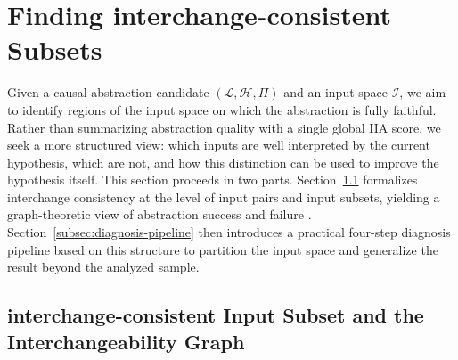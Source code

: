 \section{Finding interchange-consistent Subsets}
\label{sec:method}

Given a causal abstraction candidate \((\mathcal L,\mathcal H,\Pi)\) and an input space \(\mathcal I\), we aim to identify regions of the input space on which the abstraction is fully faithful. Rather than summarizing abstraction quality with a single global IIA score, we seek a more structured view: which inputs are well interpreted by the current hypothesis, which are not, and how this distinction can be used to improve the hypothesis itself. This section proceeds in two parts. Section~\ref{subsec:defining-perfect} formalizes interchange consistency at the level of input pairs and input subsets, yielding a graph-theoretic view of abstraction success and failure \citep{geiger-etal-2020-neural,pislar2025combining}. Section~\ref{subsec:diagnosis-pipeline} then introduces a practical four-step diagnosis pipeline based on this structure to partition the input space and generalize the result beyond the analyzed sample.

\subsection{interchange-consistent Input Subset and the Interchangeability Graph}
\label{subsec:defining-perfect}

